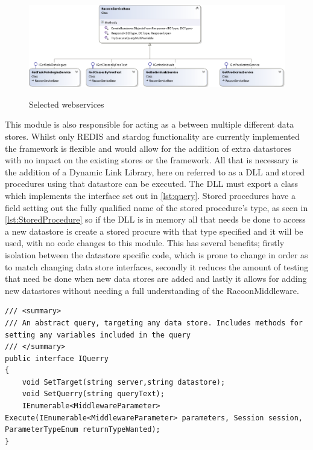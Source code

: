  \begin{figure}
\myfloatalign
{\includegraphics[width=\linewidth]{gfx/RacoonServices}} 
\caption{Selected webservices}
\label{fig:services}
\end{figure}

This module is also responsible for acting as a  between multiple different data stores. Whilst only REDIS and stardog functionality are currently implemented the framework is flexible and would allow for the addition of extra datastores with no impact on the existing stores or the framework. All that is necessary is the addition of a Dynamic Link Library, here on referred to as a DLL and stored procedures using that datastore can be executed. The DLL must export a class which implements the interface set out in \autoref{lst:query}. Stored procedures have a field setting out the fully qualified name of the stored procedure's type, as seen in \autoref{lst:StoredProcedure} so if the DLL is in memory all that needs be done to access a new datastore is create a stored procure with that type specified and it will be used, with no code changes to this module. This has several benefits; firstly isolation between the datastore specific code, which is prone to change in order as to match changing data store interfaces, secondly it reduces the amount of testing that need be done when new data stores are added and lastly it allows for adding new datastores without needing a full understanding of the RacoonMiddleware.

\begin{lstlisting}[language={[Sharp]C},frame=tb,caption={The IQuery interface, which must be implemented by all executable queries},label=lst:query]
/// <summary>
/// An abstract query, targeting any data store. Includes methods for setting any variables included in the query
/// </summary>
public interface IQuerry
{
    void SetTarget(string server,string datastore);
    void SetQuerry(string queryText);
    IEnumerable<MiddlewareParameter> Execute(IEnumerable<MiddlewareParameter> parameters, Session session, ParameterTypeEnum returnTypeWanted);      
}
\end{lstlisting}

